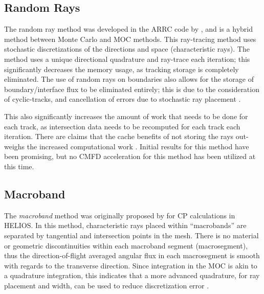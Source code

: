 {{      \subsection{Random Rays}{\label{ssec:RT:Random Rays}
        The random ray method was developed in the ARRC code by \citet{Tramm2018}, and is a hybrid method between Monte Carlo and \ac{MOC} methods.
        This ray-tracing method uses stochastic discretizations of the directions and space (characteristic rays).
        The method uses a unique directional quadrature and ray-trace each iteration; this significantly decreases the memory usage, as tracking storage is completely eliminated.
        The use of random rays on boundaries also allows for the storage of boundary/interface flux to be eliminated entirely; this is due to the consideration of cyclic-tracks, and cancellation of errors due to stochastic ray placement \cite{Tramm2018}.

        This also significantly increases the amount of work that needs to be done for each track, as intersection data needs to be recomputed for each track each iteration.
        There are claims that the cache benefits of not storing the rays out-weighs the increased computational work \cite{Tramm2018}.
        Initial results for this method have been promising, but no \ac{CMFD} acceleration for this method has been utilized at this time.
      }

      \subsection{Macroband}{\label{ssec:RT:Macroband}
        The \emph{macroband} method  was originally proposed by \citet{Villarino1992} for \ac{CP} calculations in HELIOS.
        In this method, characteristic rays placed within ``macrobands'' are separated by tangential and intersection points in the mesh.
        There is no material or geometric discontinuities within each macroband segment (macrosegment), thus the direction-of-flight averaged angular flux in each macrosegment is smooth with regards to the transverse direction.
        Since integration in the \ac{MOC} is akin to a quadrature integration, this indicates that a more advanced quadrature, for ray placement and width, can be used to reduce discretization error \cite{Yamamoto2005}.

}}}
